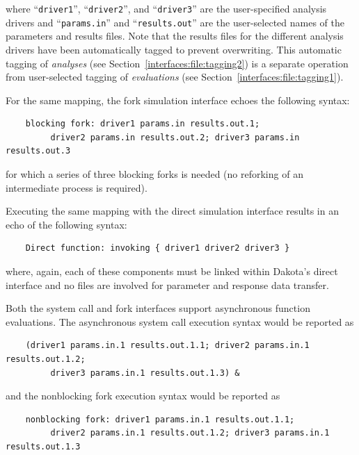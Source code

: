 where ``\texttt{driver1}'', ``\texttt{driver2}'', and
``\texttt{driver3}'' are the user-specified analysis drivers and
``\texttt{params.in}'' and ``\texttt{results.out}'' are the
user-selected names of the parameters and results files. Note that the
results files for the different analysis drivers have been
automatically tagged to prevent overwriting. This automatic tagging of
\emph{analyses} (see Section~\ref{interfaces:file:tagging2}) is a
separate operation from user-selected tagging of \emph{evaluations}
(see Section~\ref{interfaces:file:tagging1}).

For the same mapping, the fork simulation interface echoes the
following syntax:
\begin{small}
\begin{verbatim}
    blocking fork: driver1 params.in results.out.1;
         driver2 params.in results.out.2; driver3 params.in results.out.3
\end{verbatim}
\end{small}

for which a series of three blocking forks is needed (no reforking of
an intermediate process is required).

Executing the same mapping with the direct simulation interface
results in an echo of the following syntax:
\begin{small}
\begin{verbatim}
    Direct function: invoking { driver1 driver2 driver3 }
\end{verbatim}
\end{small}

where, again, each of these components must be linked within Dakota's
direct interface and no files are involved for parameter and response
data transfer.

Both the system call and fork interfaces support asynchronous function
evaluations. The asynchronous system call execution syntax would be
reported as
\begin{small}
\begin{verbatim}
    (driver1 params.in.1 results.out.1.1; driver2 params.in.1 results.out.1.2;
         driver3 params.in.1 results.out.1.3) &
\end{verbatim}
\end{small}

and the nonblocking fork execution syntax would be reported as
\begin{small}
\begin{verbatim}
    nonblocking fork: driver1 params.in.1 results.out.1.1;
         driver2 params.in.1 results.out.1.2; driver3 params.in.1 results.out.1.3
\end{verbatim}
\end{small}

